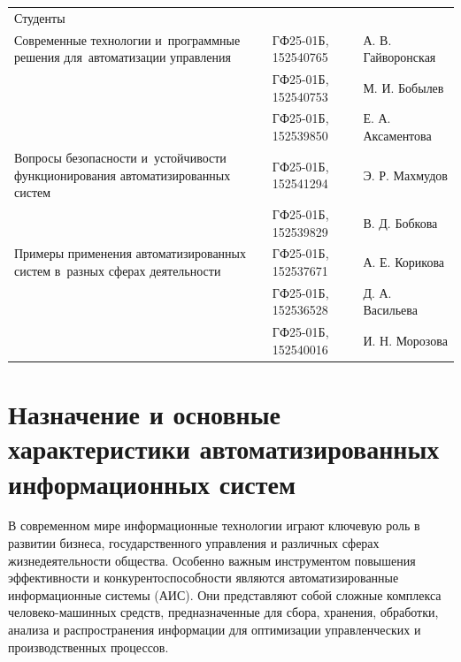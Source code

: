 \documentclass{ou}
\begin{document}
\begin{flushleft}
\doublespacing
\begin{tabularx}{\textwidth}{@{} p{} l l @{}}
Студенты     &                     &         \\
\multirow{-2.27}{\hsize}{\singlespacing Современные технологии и~программные решения для~автоматизации управления}
             & ГФ25-01Б, 152540765 & А. В. Гайворонская\\
             & ГФ25-01Б, 152540753 & М. И. Бобылев\\
             & ГФ25-01Б, 152539850 & Е. А. Аксаментова\\
\multirow{-2.27}{\hsize}{\singlespacing Вопросы безопасности и~устойчивости функционирования автоматизированных систем}
             & ГФ25-01Б, 152541294 & Э. Р. Махмудов\\
             & ГФ25-01Б, 152539829 & В. Д. Бобкова\\
\multirow{-1.27}{\hsize}{\singlespacing Примеры применения автоматизированных систем в~разных сферах деятельности}
             & ГФ25-01Б, 152537671 & А. Е. Корикова\\
             & ГФ25-01Б, 152536528 & Д. А. Васильева\\
             & ГФ25-01Б, 152540016 & И. Н. Морозова\\        
\end{tabularx}
\end{flushleft}
\newpage
{
\sloppy
\tableofcontents
}
\newpage
\onehalfspacing
\section{Назначение и основные характеристики автоматизированных информационных систем}
В современном мире информационные технологии играют ключевую роль в развитии бизнеса, государственного управления и различных сферах жизнедеятельности общества. Особенно важным инструментом повышения эффективности и конкурентоспособности являются автоматизированные информационные системы (АИС). Они представляют собой сложные комплекса человеко-машинных средств, предназначенные для сбора, хранения, обработки, анализа и распространения информации для оптимизации управленческих и производственных процессов.
\end{document}
